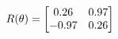 \documentclass[preview]{standalone}
\begin{document}
\begin{align*}
\special{dvisvgm:raw <g id='unique000'>}R(\theta) = \begin{bmatrix}0.26 & 0.97\\-0.97 & 0.26\end{bmatrix}\special{dvisvgm:raw </g>}
\end{align*}
\end{document}
